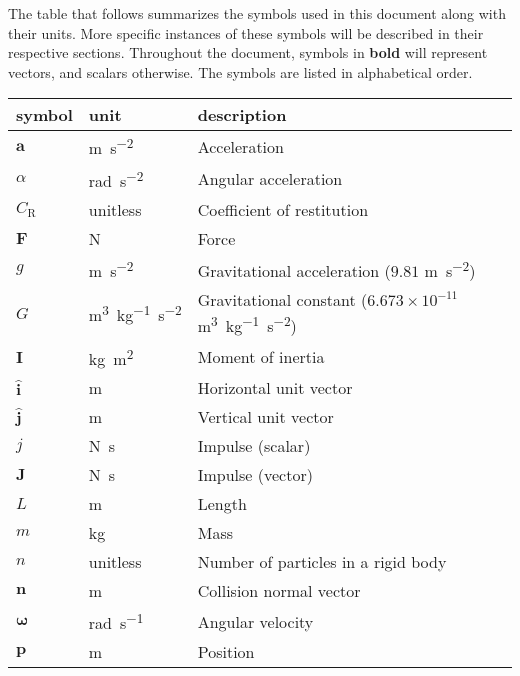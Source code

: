\documentclass[12pt]{article}
\begin{document}

The table that follows summarizes the symbols used in this document along with
their units. More specific instances of these symbols will be described in their respective sections. Throughout the document, symbols in \textbf{bold} will represent vectors, and scalars otherwise. The symbols are listed in alphabetical order.

\renewcommand{\arraystretch}{1.2}
\noindent \begin{longtable}{l l p{12cm}} \toprule
  \textbf{symbol} & \textbf{unit} & \textbf{description}\\
  \midrule 
  $\mathbf{a}$ & \si{\metre\per\second\tothe{2}} & Acceleration \\
  $\alpha$ & \si{\radian\per\second\tothe{2}} & Angular acceleration \\
  $C_\text{R}$ & unitless & Coefficient of restitution \\
  $\mathbf{F}$ & \si{\newton} & Force \\
  $g$ & \si{\metre\per\second\tothe{2}} & Gravitational acceleration ($9.81$ \si{\metre\per\second\tothe{2}}) \\
  $G$ & \si{\metre\tothe{3}\per\kilogram\second\tothe{-2}} & Gravitational constant ($6.673 \times 10^{-11}$ \si{\metre\tothe{3}\per\kilogram\second\tothe{-2}}) \\
  $\mathbf{I}$ & \si{\kilogram\metre\tothe{2}} & Moment of inertia \\
  $\mathbf{\hat{i}}$ & \si{\metre} & Horizontal unit vector \\
  $\mathbf{\hat{j}}$ & \si{\metre} & Vertical unit vector \\
  $j$ & \si{\newton\second} & Impulse (scalar) \\
  $\mathbf{J}$ & \si{\newton\second} & Impulse (vector) \\
  $L$ & \si{\metre} & Length \\
  $m$ & \si{\kilogram} & Mass \\
  $n$ & unitless & Number of particles in a rigid body \\
  $\mathbf{n}$ & \si{\metre} & Collision normal vector \\
  $\boldsymbol{\omega}$ & \si{\radian\per\second} & Angular velocity \\
  $\mathbf{p}$ & \si{\metre} & Position \\

\end{longtable}
\end{document}
